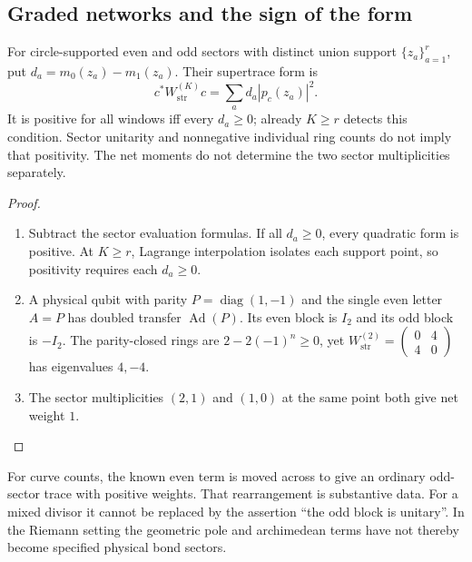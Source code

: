 \subsection{Graded networks and the sign of the form}

\begin{proposition}
\label{prop:ccm-tn-graded-net-criterion}
For circle-supported even and odd sectors with distinct union support
$\{z_a\}_{a=1}^r$, put $d_a=m_0(z_a)-m_1(z_a)$.
Their supertrace form is
\[
 c^*W_{\mathrm{str}}^{(K)}c=\sum_a d_a|p_c(z_a)|^2.
\]
It is positive for all windows iff every $d_a\geq0$; already $K\geq r$
detects this condition. Sector unitarity and nonnegative individual
ring counts do not imply that positivity. The net moments do not
determine the two sector multiplicities separately.
\end{proposition}
\begin{proof}
\begin{enumerate}
\item[$\langle1\rangle$1.] Subtract the sector evaluation formulas.
If all $d_a\geq0$, every quadratic form is positive. At $K\geq r$,
Lagrange interpolation isolates each support point, so positivity
requires each $d_a\geq0$.
\item[$\langle1\rangle$2.] A physical qubit with parity
$P=\operatorname{diag}(1,-1)$ and the single even letter $A=P$
has doubled transfer $\operatorname{Ad}(P)$. Its even block is $I_2$
and its odd block is $-I_2$. The parity-closed rings are
$2-2(-1)^n\geq0$, yet
$W_{\mathrm{str}}^{(2)}=\left(\begin{smallmatrix}0&4\\4&0\end{smallmatrix}\right)$
has eigenvalues $4,-4$.
\item[$\langle1\rangle$3.] The sector multiplicities $(2,1)$ and
$(1,0)$ at the same point both give net weight $1$.
\end{enumerate}
\end{proof}

For curve counts, the known even term is moved across to give an
ordinary odd-sector trace with positive weights. That rearrangement
is substantive data. For a mixed divisor it cannot be replaced by
the assertion ``the odd block is unitary''. In the Riemann setting
the geometric pole and archimedean terms have not thereby become
specified physical bond sectors.

